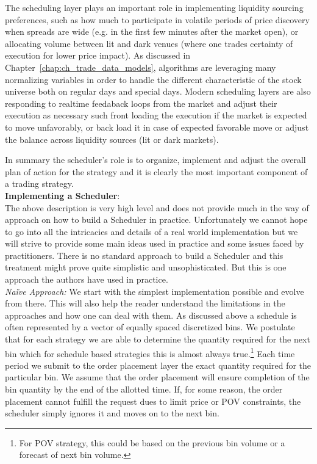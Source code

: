 The scheduling layer plays an important role in  implementing liquidity sourcing preferences, such as how much to participate in volatile periods of price discovery when spreads are wide (e.g. in the first few minutes after the market open), or allocating volume between lit and dark venues (where one trades certainty of execution for lower price impact). As discussed in Chapter~\ref{chap:ch_trade_data_models}, algorithms are leveraging many normalizing  variables in order to handle the different characteristic of the stock universe both on regular days and special days.  Modern scheduling layers are also responding to realtime feedaback loops from the market and adjust their execution as necessary such front loading the execution if the market is expected to move unfavorably, or back load it in case of expected favorable move or adjust the balance across liquidity sources (lit or dark markets). 


In summary the scheduler's role is to organize, implement and adjust the overall plan of action for the strategy and it is clearly the most important component of a trading strategy. \\


\noindent\textbf{Implementing a Scheduler}: \\


The above description is very high level and does not provide much in the way of approach on how to build a Scheduler in practice. Unfortunately we cannot hope to go into all the intricacies and details of a real world implementation but we will strive to provide some main ideas used in practice and some issues faced by practitioners. There is no standard approach to build a Scheduler and this treatment might prove quite simplistic and unsophisticated. But this is one approach the authors have used in practice. \\


\noindent\emph{Na\"ive Approach:} We start with the simplest implementation possible and evolve from there. This will also help the reader understand the limitations in the approaches and how one can deal with them. As discussed above a schedule is often represented by a vector of equally spaced discretized bins. We postulate that for each strategy we are able to determine the quantity required for the next bin which for schedule based strategies this is almost always true.\footnote{For POV strategy, this could be based on the previous bin volume or a forecast of next bin volume.} Each time period we submit to the order placement layer the exact quantity required for the particular bin. We assume that the order placement will ensure completion of the bin quantity by the end of the allotted time. If, for some reason, the order placement cannot fulfill the request dues to limit price or POV constraints, the scheduler simply ignores it and moves on to the next bin. 



